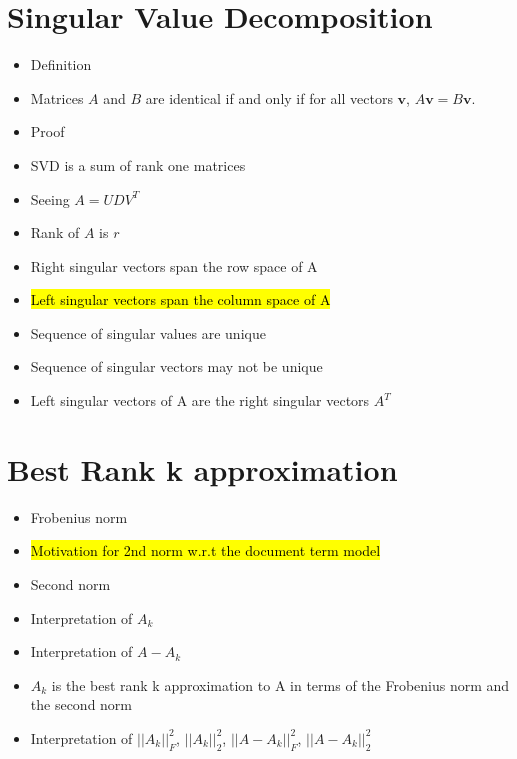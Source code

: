 \documentclass[12pt]{article}
\newcommand{\fnorm}[1]{||{#1}||_F}
\newcommand{\snorm}[1]{||{#1}||_2}
\begin{document}


\section{Singular Value Decomposition}
\begin{itemize}
\item
Definition

\item
Matrices $A$ and $B$ are identical if and only if for all vectors $\mathbf{v}$, $A\mathbf{v} = B\mathbf{v}$.

\item
Proof

\item
SVD is a sum of rank one matrices

\item
Seeing $A = U D V^T$

\item
Rank of $A$ is $r$

\item
Right singular vectors span the row space of A

\item
\hl {Left singular vectors span the column space of A}

\item
Sequence of singular values are unique

\item
Sequence of singular vectors may not be unique

\item
Left singular vectors of A are the right singular vectors $A^T$

\end{itemize}


\section{Best Rank k approximation}
\begin{itemize}
\item
Frobenius norm

\item
\hl {Motivation for 2nd norm w.r.t the document term model}

\item
Second norm

\item
Interpretation of $A_k$

\item
Interpretation of $A - A_k$

\item
$A_k$ is the best rank k approximation to A in terms of the Frobenius norm and the second norm
 
 \item
Interpretation of $\fnorm{A_k}^2$,  $\snorm{A_k}^2$, $\fnorm{A - A_k}^2$, $\snorm{A - A_k}^2$ 


\end{itemize}
\end{document}
